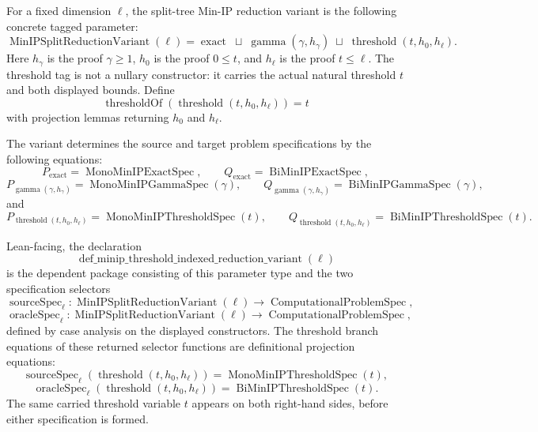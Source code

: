 \begin{definition}
  \label{def:minip-threshold-indexed-reduction-variant}
  For a fixed dimension $\ell$, the split-tree Min-IP reduction variant is the
  following concrete tagged parameter:
  \[
    \operatorname{MinIPSplitReductionVariant}(\ell)
      =
      \operatorname{exact}
      \;\sqcup\;
      \operatorname{gamma}(\gamma,h_\gamma)
      \;\sqcup\;
      \operatorname{threshold}(t,h_{0},h_{\ell}).
  \]
  Here $h_\gamma$ is the proof $\gamma\geq1$, $h_0$ is the proof
  $0\leq t$, and $h_\ell$ is the proof $t\leq\ell$.  The threshold tag is not
  a nullary constructor: it carries the actual natural threshold $t$ and both
  displayed bounds.  Define
  \[
    \operatorname{thresholdOf}
      (\operatorname{threshold}(t,h_0,h_\ell))=t
  \]
  with projection lemmas returning $h_0$ and $h_\ell$.

  The variant determines the source and target problem specifications by the
  following equations:
  \[
    P_{\operatorname{exact}}=\operatorname{MonoMinIPExactSpec},\qquad
    Q_{\operatorname{exact}}=\operatorname{BiMinIPExactSpec},
  \]
  \[
    P_{\operatorname{gamma}(\gamma,h_\gamma)}
      =\operatorname{MonoMinIPGammaSpec}(\gamma),\qquad
    Q_{\operatorname{gamma}(\gamma,h_\gamma)}
      =\operatorname{BiMinIPGammaSpec}(\gamma),
  \]
  and
  \[
    P_{\operatorname{threshold}(t,h_0,h_\ell)}
      =\operatorname{MonoMinIPThresholdSpec}(t),\qquad
    Q_{\operatorname{threshold}(t,h_0,h_\ell)}
      =\operatorname{BiMinIPThresholdSpec}(t).
  \]

  Lean-facing, the declaration
  \[
    \operatorname{def\_minip\_threshold\_indexed\_reduction\_variant}(\ell)
  \]
  is the dependent package consisting of this parameter type and the two
  specification selectors
  \[
    \operatorname{sourceSpec}_{\ell}:
      \operatorname{MinIPSplitReductionVariant}(\ell)
      \to\operatorname{ComputationalProblemSpec},
  \]
  \[
    \operatorname{oracleSpec}_{\ell}:
      \operatorname{MinIPSplitReductionVariant}(\ell)
      \to\operatorname{ComputationalProblemSpec},
  \]
  defined by case analysis on the displayed constructors.  The threshold
  branch equations of these returned selector functions are definitional
  projection equations:
  \[
    \operatorname{sourceSpec}_{\ell}
      (\operatorname{threshold}(t,h_0,h_\ell))
      =
    \operatorname{MonoMinIPThresholdSpec}(t),
  \]
  \[
    \operatorname{oracleSpec}_{\ell}
      (\operatorname{threshold}(t,h_0,h_\ell))
      =
    \operatorname{BiMinIPThresholdSpec}(t).
  \]
  The same carried threshold variable $t$ appears on both right-hand sides,
  before either specification is formed.


\end{definition}
